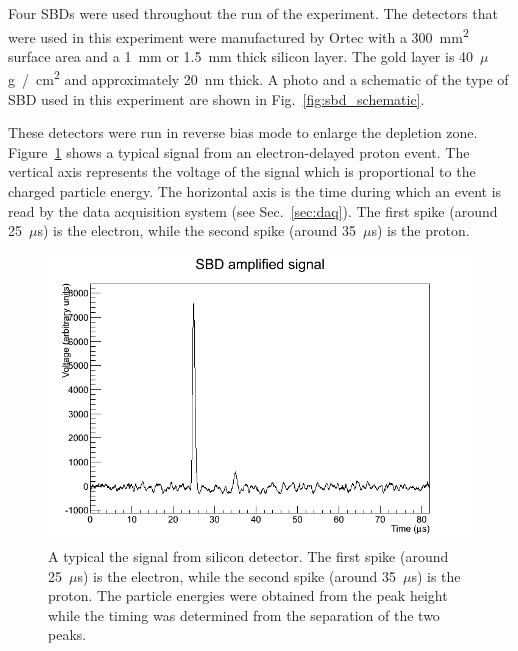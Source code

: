 \documentclass[oneside,12pt]{memoir}
\begin{document}
Four SBDs were used throughout the run of the experiment. The detectors that were used in this experiment were manufactured by Ortec with a 300~mm\textsuperscript{2} surface area and a 1~mm or 1.5~mm thick silicon layer. The gold layer is 40~$\mu$g~/~cm\textsuperscript{2} and approximately 20~nm thick.  A photo and a schematic of the type of SBD used in this experiment are shown in Fig.~\ref{fig:sbd_schematic}.\par
These detectors were run in reverse bias mode to enlarge the depletion zone. Figure~\ref{fig:sbdsig} shows a typical signal from an electron-delayed proton event. The vertical axis represents the voltage of the signal which is proportional to the charged particle energy. The horizontal axis is the time during which an event is read by the data acquisition system (see Sec.~\ref{sec:daq}). The first spike (around 25~$\mu$s) is the electron, while the second spike (around 35~$\mu$s) is the proton.\par
\begin{figure}
	\includegraphics[width=\linewidth]{SBD_Signal.png}
	\caption[Typical signal from the silicon detector]{A typical the signal from silicon detector. The first spike (around 25~$\mu$s) is the electron, while the second spike (around 35~$\mu$s) is the proton. The particle energies were obtained from the peak height while the timing was determined from the separation of the two peaks.}
	\label{fig:sbdsig}
\end{figure}
\end{document}
